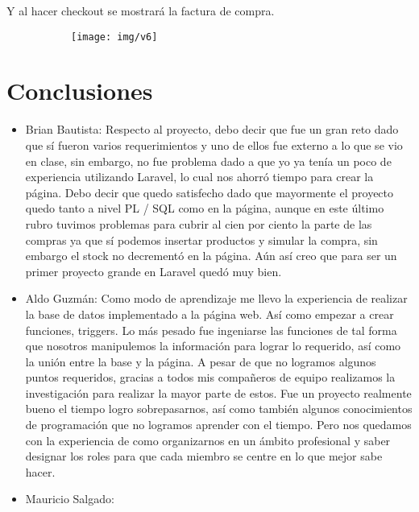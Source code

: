 \documentclass[letterpaper,12pt]{article}
\begin{document}
Y al hacer checkout se mostrará la factura de compra.

\begin{figure}[H]

	\begin{subfigure}{20cm}

		\centering

		\texttt{[image: img/v6]}

	\end{subfigure}

\end{figure}
	
	\section{Conclusiones}
	\begin{itemize}
		\item Brian Bautista: Respecto al proyecto, debo decir que fue un gran reto dado que sí fueron varios requerimientos y uno de ellos fue externo a lo que se vio en clase, sin embargo, no fue problema dado a que yo ya tenía un poco de experiencia utilizando Laravel, lo cual nos ahorró tiempo para crear la página. Debo decir que quedo satisfecho dado que mayormente el proyecto quedo tanto a nivel PL / SQL como en la página, aunque en este último rubro tuvimos problemas para cubrir al cien por ciento la parte de las compras ya que sí podemos insertar productos y simular la compra, sin embargo el stock no decrementó en la página. Aún así creo que para ser un primer proyecto grande en Laravel quedó muy bien. 
		\item Aldo Guzmán:
		Como modo de aprendizaje me llevo la experiencia de realizar la base de datos implementado a la página web. Así como empezar a crear funciones, triggers. Lo más pesado fue ingeniarse las funciones de tal forma que nosotros manipulemos la información para lograr lo requerido, así como la unión entre la base y la página. A pesar de que no logramos algunos puntos requeridos, gracias a todos mis compañeros de equipo realizamos la investigación para realizar la mayor parte de estos. Fue un proyecto realmente bueno el tiempo logro sobrepasarnos, así como también algunos conocimientos de programación que no logramos aprender con el tiempo. Pero nos quedamos con la experiencia de como organizarnos en un ámbito profesional y saber designar los roles para que cada miembro se centre en lo que mejor sabe hacer.
		\item Mauricio Salgado:

\end{itemize}
\end{document}
